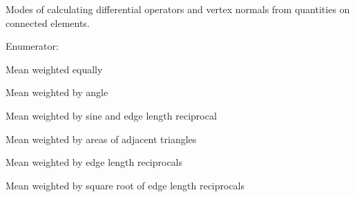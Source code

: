 Modes of calculating differential operators and vertex normals from quantities on connected elements. \begin{Desc}
\item[Enumerator: ]\par
\begin{description}
\item[{\em 
BEM3D\_\-AVERAGE\_\-MWE\label{group__codes_ggb4643c303f563fb00005135a808e33bad2d8ae687ff16ac18847d6e4a7bc6278}
}]Mean weighted equally \item[{\em 
BEM3D\_\-AVERAGE\_\-MWA\label{group__codes_ggb4643c303f563fb00005135a808e33baa9be4758d433597f6fe6b70d048f0d68}
}]Mean weighted by angle \item[{\em 
BEM3D\_\-AVERAGE\_\-MWSELR\label{group__codes_ggb4643c303f563fb00005135a808e33ba6769e16cf024026c36a53be7b6e055c9}
}]Mean weighted by sine and edge length reciprocal \item[{\em 
BEM3D\_\-AVERAGE\_\-MWAAT\label{group__codes_ggb4643c303f563fb00005135a808e33ba5996973eaef7e3527687e6bb5b08bbc6}
}]Mean weighted by areas of adjacent triangles \item[{\em 
BEM3D\_\-AVERAGE\_\-MWELR\label{group__codes_ggb4643c303f563fb00005135a808e33ba3ad759a41e94170b3db74debf9471b3f}
}]Mean weighted by edge length reciprocals \item[{\em 
BEM3D\_\-AVERAGE\_\-MWRELR\label{group__codes_ggb4643c303f563fb00005135a808e33ba07f298fcccd380af326e6ecc4f3482e3}
}]Mean weighted by square root of edge length reciprocals \end{description}
\end{Desc}

